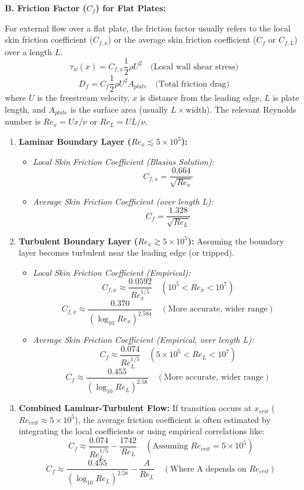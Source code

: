 \textbf{B. Friction Factor (\(C_f\)) for Flat Plates:}

For external flow over a flat plate, the friction factor usually refers
to the local skin friction coefficient (\(C_{f,x}\)) or the average skin
friction coefficient (\(C_f\) or \(C_{f,L}\)) over a length \(L\).
\[ \tau_w(x) = C_{f,x} \frac{1}{2} \rho U^2 \quad \text{(Local wall shear stress)} \]
\[ D_f = C_f \frac{1}{2} \rho U^2 A_{plate} \quad \text{(Total friction drag)} \]
where \(U\) is the freestream velocity, \(x\) is distance from the
leading edge, \(L\) is plate length, and \(A_{plate}\) is the surface
area (usually \(L \times \text{width}\)). The relevant Reynolds number
is \(Re_x = Ux/\nu\) or \(Re_L = UL/\nu\).

\begin{enumerate}
\def\labelenumi{\arabic{enumi}.}
\tightlist
\item
  \textbf{Laminar Boundary Layer (\(Re_x \lesssim 5 \times 10^5\)):}

  \begin{itemize}
  \tightlist
  \item
    \emph{Local Skin Friction Coefficient (Blasius Solution):}
    \[ \boxed{ C_{f,x} = \frac{0.664}{\sqrt{Re_x}} } \]
  \item
    \emph{Average Skin Friction Coefficient (over length L):}
    \[ \boxed{ C_f = \frac{1.328}{\sqrt{Re_L}} } \]
  \end{itemize}
\item
  \textbf{Turbulent Boundary Layer (\(Re_x \gtrsim 5 \times 10^5\)):}
  Assuming the boundary layer becomes turbulent near the leading edge
  (or tripped).

  \begin{itemize}
  \tightlist
  \item
    \emph{Local Skin Friction Coefficient (Empirical):}
    \[ \boxed{ C_{f,x} \approx \frac{0.0592}{Re_x^{1/5}} } \quad (10^5 < Re_x < 10^7) \]
    \[ C_{f,x} \approx \frac{0.370}{(\log_{10} Re_x)^{2.584}} \quad (\text{More accurate, wider range}) \]
  \item
    \emph{Average Skin Friction Coefficient (Empirical, over length L):}
    \[ \boxed{ C_f \approx \frac{0.074}{Re_L^{1/5}} } \quad (5 \times 10^5 < Re_L < 10^7) \]
    \[ C_f \approx \frac{0.455}{(\log_{10} Re_L)^{2.58}} \quad (\text{More accurate, wider range}) \]
  \end{itemize}
\item
  \textbf{Combined Laminar-Turbulent Flow:} If transition occurs at
  \(x_{crit}\) (\(Re_{crit} \approx 5 \times 10^5\)), the average
  friction coefficient is often estimated by integrating the local
  coefficients or using empirical correlations like:
  \[ \boxed{ C_f \approx \frac{0.074}{Re_L^{1/5}} - \frac{1742}{Re_L} } \quad (\text{Assuming } Re_{crit}=5\times 10^5) \]
  \[ C_f \approx \frac{0.455}{(\log_{10} Re_L)^{2.58}} - \frac{A}{Re_L} \quad (\text{Where A depends on } Re_{crit}) \]
\end{enumerate}

